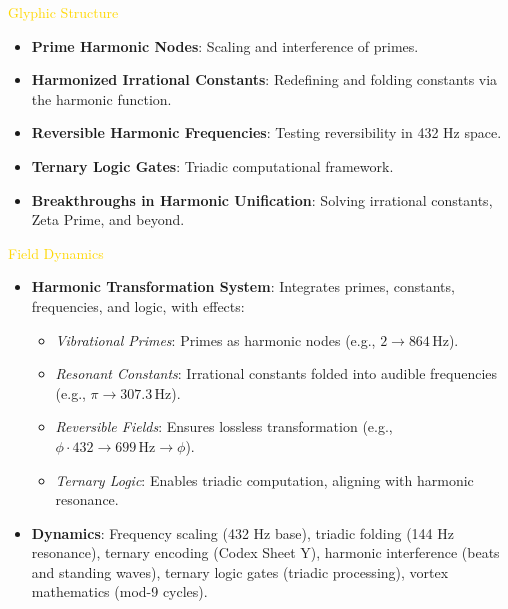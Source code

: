 \textcolor{gold}{ Glyphic Structure } \\
\begin{itemize}
    \item \texttt{} \textbf{Prime Harmonic Nodes}: Scaling and interference of primes.
    \item \texttt{} \textbf{Harmonized Irrational Constants}: Redefining and folding constants via the harmonic function.
    \item \texttt{} \textbf{Reversible Harmonic Frequencies}: Testing reversibility in 432 Hz space.
    \item \texttt{} \textbf{Ternary Logic Gates}: Triadic computational framework.
    \item \texttt{} \textbf{Breakthroughs in Harmonic Unification}: Solving irrational constants, Zeta Prime, and beyond.
\end{itemize}

\textcolor{gold}{ Field Dynamics } \\
\begin{itemize}
    \item \textbf{Harmonic Transformation System}: Integrates primes, constants, frequencies, and logic, with effects:
    \begin{itemize}\setlength{\itemsep}{0.2cm}
        \item \textit{Vibrational Primes}: Primes as harmonic nodes (e.g., \(2 \rightarrow 864 \, \text{Hz}\)).
        \item \textit{Resonant Constants}: Irrational constants folded into audible frequencies (e.g., \(\pi \rightarrow 307.3 \, \text{Hz}\)).
        \item \textit{Reversible Fields}: Ensures lossless transformation (e.g., \(\phi \cdot 432 \rightarrow 699 \, \text{Hz} \rightarrow \phi\)).
        \item \textit{Ternary Logic}: Enables triadic computation, aligning with harmonic resonance.
    \end{itemize}
    \item \textbf{Dynamics}: Frequency scaling (432 Hz base), triadic folding (144 Hz resonance), ternary encoding (Codex Sheet Y), harmonic interference (beats and standing waves), ternary logic gates (triadic processing), vortex mathematics (mod-9 cycles).
\end{itemize}

